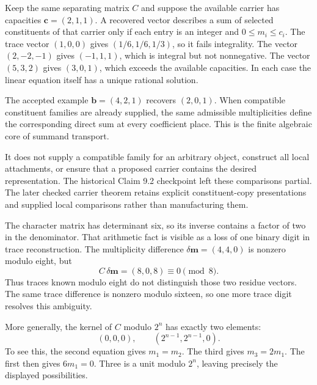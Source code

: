 Keep the same separating matrix $C$ and suppose the available carrier has capacities $\bm c=(2,1,1)$. A recovered vector describes a sum of selected constituents of that carrier only if each entry is an integer and $0\le m_i\le c_i$.
The trace vector $(1,0,0)$ gives $(1/6,1/6,1/3)$, so it fails integrality. The vector $(2,-2,-1)$ gives $(-1,1,1)$, which is integral but not nonnegative. The vector $(5,3,2)$ gives $(3,0,1)$, which exceeds the available capacities. In each case the linear equation itself has a unique rational solution.

The accepted example $\bm b=(4,2,1)$ recovers $(2,0,1)$. When compatible constituent families are already supplied, the same admissible multiplicities define the corresponding direct sum at every coefficient place. This is the finite algebraic core of summand transport.

It does not supply a compatible family for an arbitrary object, construct all local attachments, or ensure that a proposed carrier contains the desired representation. The historical Claim 9.2 checkpoint left these comparisons partial. The later checked carrier theorem retains explicit constituent-copy presentations and supplied local comparisons rather than manufacturing them.

The character matrix has determinant six, so its inverse contains a factor of two in the denominator. That arithmetic fact is visible as a loss of one binary digit in trace reconstruction.
The multiplicity difference $\delta\bm m=(4,4,0)$ is nonzero modulo eight, but
\[
C\,\delta\bm m=(8,0,8)\equiv0\pmod8.
\]
Thus traces known modulo eight do not distinguish those two residue vectors. The same trace difference is nonzero modulo sixteen, so one more trace digit resolves this ambiguity.

More generally, the kernel of $C$ modulo $2^n$ has exactly two elements:
\[
(0,0,0),\qquad(2^{n-1},2^{n-1},0).
\]
To see this, the second equation gives $m_1=m_2$. The third gives $m_3=2m_1$. The first then gives $6m_1=0$. Three is a unit modulo $2^n$, leaving precisely the displayed possibilities.

